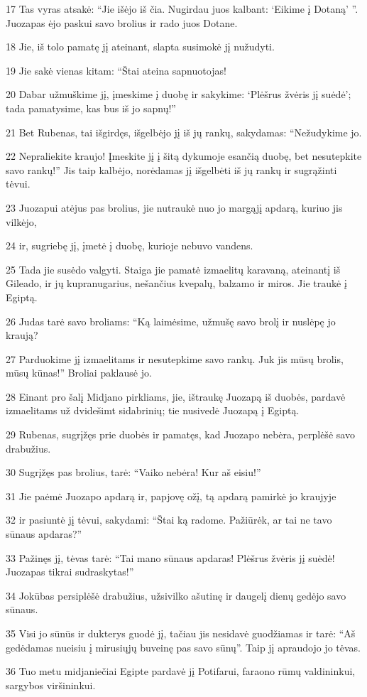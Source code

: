 \par 17 Tas vyras atsakė: “Jie išėjo iš čia. Nugirdau juos kalbant: ‘Eikime į Dotaną’ ”. Juozapas ėjo paskui savo brolius ir rado juos Dotane. 
\par 18 Jie, iš tolo pamatę jį ateinant, slapta susimokė jį nužudyti. 
\par 19 Jie sakė vienas kitam: “Štai ateina sapnuotojas! 
\par 20 Dabar užmuškime jį, įmeskime į duobę ir sakykime: ‘Plėšrus žvėris jį suėdė’; tada pamatysime, kas bus iš jo sapnų!” 
\par 21 Bet Rubenas, tai išgirdęs, išgelbėjo jį iš jų rankų, sakydamas: “Nežudykime jo. 
\par 22 Nepraliekite kraujo! Įmeskite jį į šitą dykumoje esančią duobę, bet nesutepkite savo rankų!” Jis taip kalbėjo, norėdamas jį išgelbėti iš jų rankų ir sugrąžinti tėvui. 
\par 23 Juozapui atėjus pas brolius, jie nutraukė nuo jo margąjį apdarą, kuriuo jis vilkėjo, 
\par 24 ir, sugriebę jį, įmetė į duobę, kurioje nebuvo vandens. 
\par 25 Tada jie susėdo valgyti. Staiga jie pamatė izmaelitų karavaną, ateinantį iš Gileado, ir jų kupranugarius, nešančius kvepalų, balzamo ir miros. Jie traukė į Egiptą. 
\par 26 Judas tarė savo broliams: “Ką laimėsime, užmušę savo brolį ir nuslėpę jo kraują? 
\par 27 Parduokime jį izmaelitams ir nesutepkime savo rankų. Juk jis mūsų brolis, mūsų kūnas!” Broliai paklausė jo. 
\par 28 Einant pro šalį Midjano pirkliams, jie, ištraukę Juozapą iš duobės, pardavė izmaelitams už dvidešimt sidabrinių; tie nusivedė Juozapą į Egiptą. 
\par 29 Rubenas, sugrįžęs prie duobės ir pamatęs, kad Juozapo nebėra, perplėšė savo drabužius. 
\par 30 Sugrįžęs pas brolius, tarė: “Vaiko nebėra! Kur aš eisiu!” 
\par 31 Jie paėmė Juozapo apdarą ir, papjovę ožį, tą apdarą pamirkė jo kraujyje 
\par 32 ir pasiuntė jį tėvui, sakydami: “Štai ką radome. Pažiūrėk, ar tai ne tavo sūnaus apdaras?” 
\par 33 Pažinęs jį, tėvas tarė: “Tai mano sūnaus apdaras! Plėšrus žvėris jį suėdė! Juozapas tikrai sudraskytas!” 
\par 34 Jokūbas persiplėšė drabužius, užsivilko ašutinę ir daugelį dienų gedėjo savo sūnaus. 
\par 35 Visi jo sūnūs ir dukterys guodė jį, tačiau jis nesidavė guodžiamas ir tarė: “Aš gedėdamas nueisiu į mirusiųjų buveinę pas savo sūnų”. Taip jį apraudojo jo tėvas. 
\par 36 Tuo metu midjaniečiai Egipte pardavė jį Potifarui, faraono rūmų valdininkui, sargybos viršininkui.



